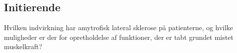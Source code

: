 \subsection{Initierende}
Hvilken indvirkning har amytrofisk lateral sklerose på patienterne, og hvilke muligheder er der for opretholdelse af funktioner, der er tabt grundet mistet muskelkraft?